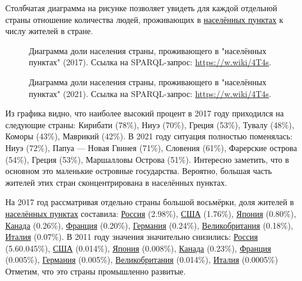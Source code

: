 Столбчатая диаграмма на рисунке позволяет увидеть для каждой отдельной страны отношение количества людей, проживающих в \href{http://www.wikidata.org/entity/Q486972}{населённых пунктах} к числу жителей в стране.

\begin{figure*}
    \setlength{\fboxsep}{0pt}%
    \setlength{\fboxrule}{1pt}%
	\label{fig:human-settlement-3}
	\caption[Диаграмма доли населения страны. Карелия, 2017.]{Диаграмма доли населения страны, проживающего в "населённых пунктах" (2017). Ссылка на SPARQL-запрос: \href{https://w.wiki/4T4s}{https://w.wiki/4T4s}.}%
\end{figure*} 

\begin{figure*}
    \setlength{\fboxsep}{0pt}%
    \setlength{\fboxrule}{1pt}%
	\label{fig:human-settlement-4}
	\caption[Диаграмма доли населения страны, 2021.]{Диаграмма доли населения страны, проживающего в "населённых пунктах" (2021). Ссылка на SPARQL-запрос: \href{https://w.wiki/4T4s}{https://w.wiki/4T4s}.}%
\end{figure*} 

Из графика видно, что наиболее высокий процент в 2017 году приходился на следующие страны: Кирибати (78\%), Ниуэ (70\%), Греция (53\%), Тувалу (48\%), Коморы (43\%), Маврикий (42\%). В 2021 году ситуация полностью поменялась: Ниуэ (72\%), Папуа — Новая Гвинея (71\%), Словения (61\%), Фарерские острова (54\%), Греция (53\%), Маршалловы Острова (51\%). Интересно заметить, что в основном это маленькие островные государства. Вероятно, большая часть жителей этих стран сконцентрирована в населённых пунктах.

На 2017 год рассматривая отдельно страны большой восьмёрки, доля жителей в \href{http://www.wikidata.org/entity/Q486972}{населённых пунктах} составила: \href{http://www.wikidata.org/entity/Q159}{Россия} (\num{2.98}\%), \href{http://www.wikidata.org/entity/Q30}{США} (\num{1.76}\%), \href{http://www.wikidata.org/entity/Q17}{Япония} (\num{0.80}\%), \href{http://www.wikidata.org/entity/Q16}{Канада} (\num{0.26}\%), \href{http://www.wikidata.org/entity/Q142}{Франция} (\num{0.20}\%), \href{http://www.wikidata.org/entity/Q183}{Германия} (\num{0.24}\%), \href{http://www.wikidata.org/entity/Q145}{Великобритания} (\num{0.18}\%), \href{http://www.wikidata.org/entity/Q38}{Италия} (\num{0.07}\%). В 2011 году значения значительно снизились: \href{http://www.wikidata.org/entity/Q159}{Россия} (\num{5,6}0.045\%), \href{http://www.wikidata.org/entity/Q30}{США} (\num{0.014}\%), \href{http://www.wikidata.org/entity/Q17}{Япония} (\num{0.008}\%), \href{http://www.wikidata.org/entity/Q16}{Канада} (\num{0.23}\%), \href{http://www.wikidata.org/entity/Q142}{Франция} (\num{0.005}\%), \href{http://www.wikidata.org/entity/Q183}{Германия} (\num{0.005}\%), \href{http://www.wikidata.org/entity/Q145}{Великобритания} (\num{0.014}\%), \href{http://www.wikidata.org/entity/Q38}{Италия} (\num{0.0005}\%) Отметим, что это страны промышленно развитые.

